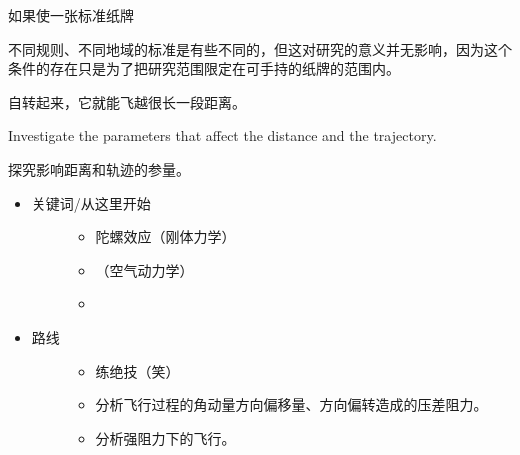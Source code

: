 \documentclass[a4paper,10pt,english]{sphinxmanual}
\begin{document}
如果使一张标准纸牌 %
\begin{footnote}[12]\sphinxAtStartFootnote
不同规则、不同地域的标准是有些不同的，但这对研究的意义并无影响，因为这个条件的存在只是为了把研究范围限定在可手持的纸牌的范围内。
%
\end{footnote} 自转起来，它就能飞越很长一段距离。

Investigate the parameters that affect the distance and the trajectory.

探究影响距离和轨迹的参量。
\begin{itemize}
\item {} \begin{description}
\item[{关键词/从这里开始}] \leavevmode\begin{itemize}
\item {} 
陀螺效应（刚体力学）

\item {} 
 （空气动力学）

\item {} 

\end{itemize}

\end{description}

\item {} \begin{description}
\item[{路线}] \leavevmode\begin{itemize}
\item {} 
练绝技（笑）

\item {} 
分析飞行过程的角动量方向偏移量、方向偏转造成的压差阻力。

\item {} 
分析强阻力下的飞行。

\end{itemize}

\end{description}

\end{itemize}
\end{document}
